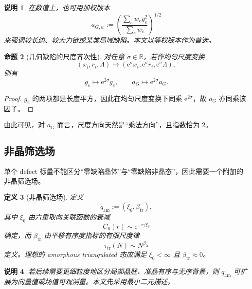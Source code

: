 \documentclass[12pt]{ctexart}
\newtheorem{definition}{定义}[section]
\newtheorem{proposition}[definition]{命题}
\newtheorem{remark}[definition]{说明}
\newcommand{\ee}{\mathrm{e}}
\newcommand{\RR}{\mathbb{R}}
\newcommand{\tr}{\mathrm{tr}}
\begin{document}
\begin{remark}
在数值上，也可用加权版本
\begin{equation}
 a_{G,w} := \left(\frac{\sum_e w_e g_e^2}{\sum_e w_e}\right)^{1/2}
\end{equation}
来强调较长边、较大力链或某类局域缺陷。本文以等权版本作为首选。
\end{remark}

\begin{proposition}[几何缺陷的尺度齐次性]
对任意 $\sigma\in\RR$，若作均匀尺度变换
\begin{equation}
(x_i,r_i,\Lambda)\mapsto (\ee^{\sigma}x_i,\ee^{\sigma}r_i,\ee^{\sigma}\Lambda),
\end{equation}
则有
\begin{equation}
 g_e \mapsto \ee^{2\sigma}g_e,
\qquad
 a_G \mapsto \ee^{2\sigma}a_G.
\end{equation}
\end{proposition}

\begin{proof}
$g_e$ 的两项都是长度平方，因此在均匀尺度变换下同乘 $\ee^{2\sigma}$，故 $a_G$ 亦同乘该因子。
\end{proof}

由此可见，对 $a_G$ 而言，尺度方向天然是“乘法方向”，且指数恰为 $2$。

\subsection{非晶筛选场}

单个 defect 标量不能区分“零缺陷晶体”与“零缺陷非晶态”，因此需要一个附加的非晶筛选场。

\begin{definition}[非晶筛选场]
定义
\begin{equation}
q_{\mathrm{am}} := (\xi_6,\beta_{\tr}),
\end{equation}
其中 $\xi_6$ 由六重取向关联函数的衰减
\begin{equation}
C_6(r)\sim \ee^{-r/\xi_6}
\end{equation}
确定，而 $\beta_{\tr}$ 由平移有序度指标的有限尺度律
\begin{equation}
\tau_{\tr}(N)\sim N^{\beta_{\tr}}
\end{equation}
定义。理想的 amorphous triangulated 态应满足 $\xi_6<\infty$ 且 $\beta_{\tr}\approx 0$。
\end{definition}

\begin{remark}
若后续需要更细粒度地区分局部晶胚、准晶有序与无序背景，则 $q_{\mathrm{am}}$ 可扩展为向量值或场值可观测量。本文先采用最小二元描述。
\end{remark}
\end{document}
